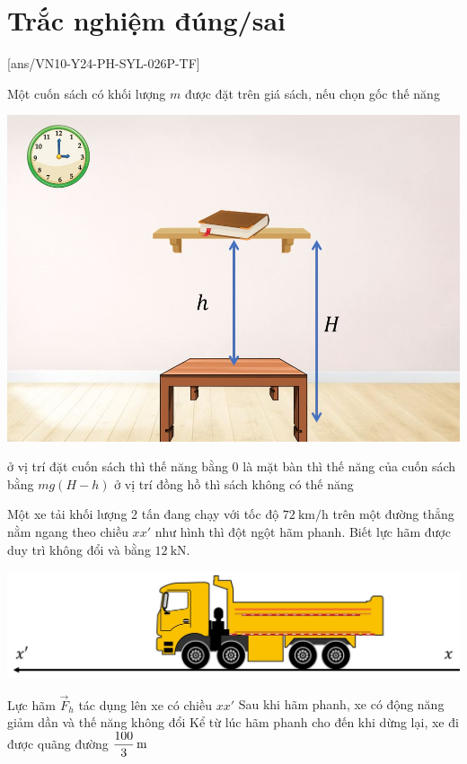 \section{Trắc nghiệm đúng/sai}
\setcounter{ex}{0}
[ans/VN10-Y24-PH-SYL-026P-TF]
\begin{ex}
	Một cuốn sách có khối lượng $m$ được đặt trên giá sách, nếu chọn gốc thế năng
	\begin{center}
		\includegraphics[width=0.4\linewidth]{../figs/VN10-2022-PH-TP026-P-2}
	\end{center}
	{\True ở vị trí đặt cuốn sách thì thế năng bằng 0}
	{là mặt bàn thì thế năng của cuốn sách bằng $mg\left(H-h\right)$}
	{ở vị trí đồng hồ thì sách không có thế năng}
	\loigiai{}
\end{ex}
\begin{ex}
Một xe tải khối lượng 2 tấn đang chạy với tốc độ $\SI{72}{\kilo\meter/\hour}$ trên một đường thẳng nằm ngang theo chiều $xx'$ như hình thì đột ngột hãm phanh. Biết lực hãm được duy trì không đổi và bằng $\SI{12}{\kilo\newton}$.
\begin{center}
	\includegraphics[width=0.5\linewidth]{../figs/VN10-2022-PH-TP026-P-3}
\end{center}
	{Lực hãm $\vec{F}_h$ tác dụng lên xe có chiều $xx'$}
	{\True Sau khi hãm phanh, xe có động năng giảm dần và thế năng không đổi}
	{\True Kể từ lúc hãm phanh cho đến khi dừng lại, xe đi được quãng đường $\xsi{\dfrac{100}{3}}{\meter}$}
	\loigiai{}
\end{ex}
